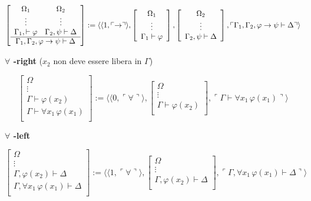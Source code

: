 {\tiny
$$
\left [
\begin{array}{cc}
\Omega_1 & \Omega_{2} \\
\vdots & \vdots\\
\Gamma_1, \vdash \varphi & \Gamma_2, \psi \vdash \Delta\\
\hline
\multicolumn{2}{c}{\Gamma_1, \Gamma_2, \varphi \rightarrow \psi \vdash \Delta}\\
\end{array}
\right ]
:= \langle \langle 1,\ulcorner \rightarrow \urcorner \rangle ,
\left [
\begin{array}{c}
\Omega_1\\
\vdots\\
\Gamma_1 \vdash \varphi\\
\end{array}
\right ],
\left [
\begin{array}{c}
\Omega_2\\
\vdots\\
\Gamma_2, \psi \vdash \Delta\\
\end{array}
\right],
\ulcorner \Gamma_1, \Gamma_2,  \varphi \rightarrow \psi \vdash \Delta \urcorner \rangle
$$}

\vspace{0.5cm}

\textbf{$\forall$ -right} ($x_2$ non deve essere libera in $\Gamma$)

$$
\left [
\begin{array}{c}
\Omega\\
\vdots\\
\Gamma \vdash \varphi(x_2)\\
\hline
\Gamma  \vdash \forall x_1\,\varphi(x_1)\\
\end{array}
\right ]
:= \langle \langle 0,\ulcorner \forall \urcorner \rangle ,
\left [
\begin{array}{c}
\Omega\\
\vdots\\
\Gamma \vdash \varphi(x_2)\\
\end{array}
\right ],
\ulcorner \Gamma \vdash \forall x_1\,\varphi(x_1) \urcorner \rangle
$$

\vspace{0.5cm}

\textbf{$\forall$ -left}

$$
\left [
\begin{array}{c}
\Omega\\
\vdots\\
\Gamma, \varphi(x_2) \vdash \Delta\\
\hline
\Gamma, \forall x_1\,\varphi(x_1) \vdash \Delta\\
\end{array}
\right ]
:= \langle \langle 1,\ulcorner \forall \urcorner \rangle ,
\left [
\begin{array}{c}
\Omega\\
\vdots\\
\Gamma, \varphi(x_2) \vdash \Delta\\
\end{array}
\right ],
\ulcorner \Gamma, \forall x_1\,\varphi(x_1) \vdash \Delta \urcorner \rangle
$$

